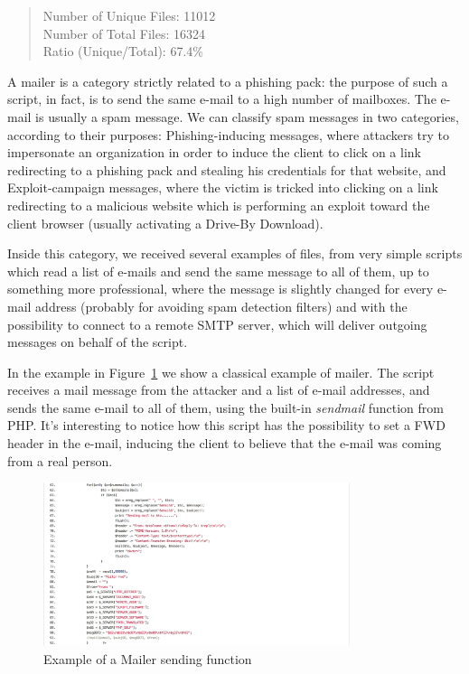 \begin{quote}
Number of Unique Files: 11012\\
Number of Total Files: 16324\\
Ratio (Unique/Total): 67.4\%
\end{quote}

A mailer is a category strictly related to a phishing pack: the purpose of such a script, in fact, is to send the same e-mail to a high number of mailboxes. The e-mail is usually a spam message. We can classify spam messages in two categories, according to their purposes: Phishing-inducing messages, where attackers try to impersonate an organization in order to induce the client to click on a link redirecting to a phishing pack and stealing his credentials for that website, and Exploit-campaign messages, where the victim is tricked into clicking on a link redirecting to a malicious website which is performing an exploit toward the client browser (usually activating a Drive-By Download).

Inside this category, we received several examples of files, from very simple scripts which read a list of e-mails and send the same message to all of them, up to something more professional, where the message is slightly changed for every e-mail address (probably for avoiding spam detection filters) and with the possibility to connect to a remote SMTP server, which will deliver outgoing messages on behalf of the script.

In the example in Figure~\ref{fig:mailer} we show a classical example of mailer. The script receives a mail message from the attacker and a list of e-mail addresses, and sends the same e-mail to all of them, using the built-in \emph{sendmail} function from PHP. It's interesting to notice how this script has the possibility to set a FWD header in the e-mail, inducing the client to believe that the e-mail was coming from a real person.

\begin{figure}[H]
\centerline{\includegraphics[width=0.8\textwidth]{Images/mailer.jpg}}
\caption{Example of a Mailer sending function\label{fig:mailer}}
\end{figure}

